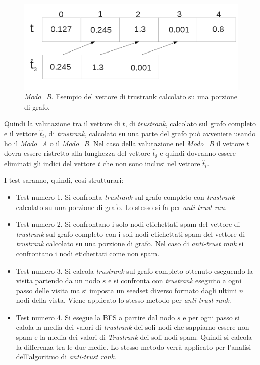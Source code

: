 \begin{figure}
\centering
 \includegraphics{immagini/test/tBFSmodoB}
 \caption{\textit{Modo\_B}. Esempio del vettore di trustrank calcolato su una porzione di grafo.}
 \label{fig:tBFSmodoB}
\end{figure}

Quindi la valutazione tra il vettore di \(t\), di \textit{trustrank}, calcolato sul grafo completo e il vettore \(\hat{t}_i\), di \textit{trustrank}, calcolato su una parte del grafo può avveniere usando ho il \textit{Modo\_A} o il \textit{Modo\_B}. Nel caso della valutazione nel \textit{Modo\_B} il vettore \(t\) dovra essere ristretto alla lunghezza del vettore \(\hat{t}_i\) e quindi dovranno essere eliminati gli indici del vettore \(t\) che non sono inclusi nel vettore \(\hat{t}_i\).

I test saranno, quindi, cosi strutturari:
\begin{itemize}
 \item Test numero 1. Si confronta \textit{trustrank} sul grafo completo con \textit{trustrank} calcolato su una porzione di grafo. Lo stesso si fa per \textit{anti-trust ran}.
 \item Test numero 2. Si confrontano i solo nodi etichettati spam del vettore di  \textit{trustrank} sul grafo completo con  i soli nodi etichettati spam del vettore di \textit{trustrank} calcolato su una porzione di grafo. Nel caso di \textit{anti-trust rank} si  confrontano i nodi etichettati come non spam.
 \item Test numero 3. Si calcola \textit{trustrank} sul grafo completo ottenuto eseguendo la visita partendo da un nodo \(s\) e si confronta con \textit{trustrank} eseguito a ogni passo delle visita ma si imposta un seedset diverso formato dagli ultimi \(n\) nodi della vista. Viene applicato lo stesso metodo per \textit{anti-trust rank}.
 \item Test numero 4. Si esegue la BFS a partire dal nodo \(s\) e per ogni passo si calola la media dei valori di \textit{trustrank} dei soli nodi che sappiamo essere non spam e la media dei valori di \textit{Trustrank} dei soli nodi spam. Quindi si calcola la differenza tra le due medie. Lo stesso metodo verrà applicato per l'analisi dell'algoritmo di \textit{anti-trust rank}.
 \end{itemize}

